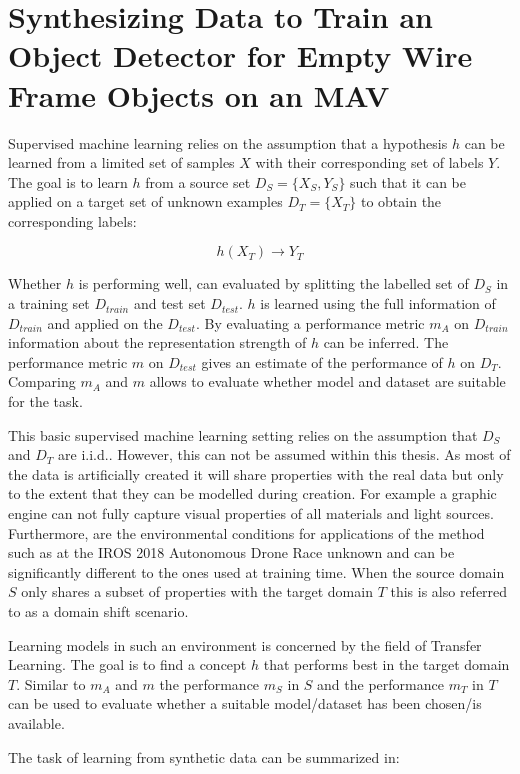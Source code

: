 \chapter{Synthesizing Data to Train an Object Detector for Empty Wire Frame Objects on an \ac{MAV}}
\label{sec:training}

Supervised machine learning relies on the assumption that a hypothesis $h$ can be learned from a limited set of samples $X$ with their corresponding set of labels $Y$. The goal is to learn $h$ from a source set $D_S = \{X_{S},Y_{S}\}$ such that it can be applied on a target set of unknown examples $D_T = \{X_{T}\}$ to obtain the corresponding labels:

$$
h(X_T)\rightarrow Y_T
$$ 

Whether $h$ is performing well, can evaluated by splitting the labelled set of $D_S$ in a training set $D_{train}$ and test set $D_{test}$. $h$ is learned using the full information of $D_{train}$ and applied on the $D_{test}$. By evaluating a performance metric $m_A$ on $D_{train}$ information about the representation strength of $h$ can be inferred. The performance metric $m$ on $D_{test}$ gives an estimate of the performance of $h$ on $D_T$. Comparing $m_A$ and $m$ allows to evaluate whether model and dataset are suitable for the task.
			
This basic supervised machine learning setting relies on the assumption that $D_S$ and $D_T$ are \ac{i.i.d.}. However, this can not be assumed within this thesis. As most of the data is artificially created it will share properties with the real data but only to the extent that they can be modelled during creation. For example a graphic engine can not fully capture visual properties of all materials and light sources. Furthermore, are the environmental conditions for applications of the method such as at the \ac{IROS} 2018 Autonomous Drone Race unknown and can be significantly different to the ones used at training time. When the source domain $S$ only shares a subset of properties with the target domain $T$ this is also referred to as a domain shift scenario.

Learning models in such an environment is concerned by the field of Transfer Learning. The goal is to find a concept $h$ that performs best in the target domain $T$. Similar to $m_A$ and $m$ the performance $m_S$ in $S$ and the performance $m_T$ in $T$ can be used to evaluate whether a suitable model/dataset has been chosen/is available.

The task of learning from synthetic data can be summarized in:

